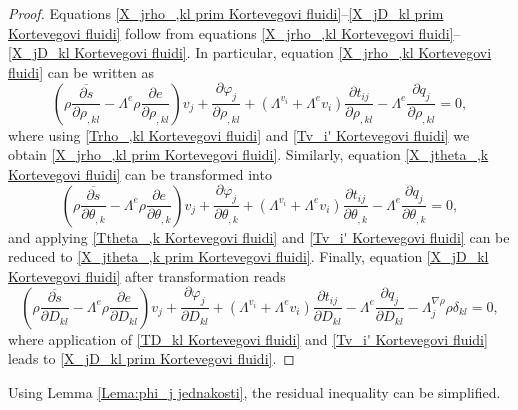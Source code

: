 \documentclass[a4paper,fleqn]{cas-sc}
\theoremstyle{definition}
\begin{document}
\begin{proof}
	Equations \eqref{X_jrho_,kl prim Kortevegovi fluidi}--\eqref{X_jD_kl prim Kortevegovi fluidi} follow from equations \eqref{X_jrho_,kl Kortevegovi fluidi}--\eqref{X_jD_kl Kortevegovi fluidi}. In particular, equation \eqref{X_jrho_,kl Kortevegovi fluidi} can be written as
	\begin{equation*}
		\label{koeficijent uz rho_,kl po x_j Kortevegovi fluidi}
		\left( \rho\overline{\dfrac{\partial s}{\partial\rho_{,kl}}} 
		- \Lambda^e\rho\dfrac{\partial e}{\partial\rho_{,kl}} \right) v_j 
		+ \dfrac{\partial\varphi_j}{\partial\rho_{,kl}} 
		+ \left( \Lambda^{v_i} + \Lambda^e v_i \right) \dfrac{\partial t_{ij}}{\partial\rho_{,kl}} 
		- \Lambda^e\dfrac{\partial q_j}{\partial\rho_{,kl}} = 0,
	\end{equation*}
	where using \eqref{Trho_,kl Kortevegovi fluidi} and \eqref{Tv_i' Kortevegovi fluidi} we obtain \eqref{X_jrho_,kl prim Kortevegovi fluidi}. Similarly, equation \eqref{X_jtheta_,k Kortevegovi fluidi} can be transformed into
	\begin{equation*}
		\label{koeficijent uz theta_,k po x_j Kortevegovi fluidi}
		\left(\rho\overline{\dfrac{\partial s}{\partial\theta_{,k}}} 
		- \Lambda^e\rho\dfrac{\partial e}{\partial\theta_{,k}}\right) v_j 
		+ \dfrac{\partial\varphi_j}{\partial\theta_{,k}} 
		+ \left( \Lambda^{v_i} + \Lambda^e v_i \right) \dfrac{\partial t_{ij}}{\partial\theta_{,k}} 
		- \Lambda^e\dfrac{\partial q_j}{\partial\theta_{,k}} = 0, 
	\end{equation*}
	and applying \eqref{Ttheta_,k Kortevegovi fluidi} and \eqref{Tv_i' Kortevegovi fluidi} can be reduced to \eqref{X_jtheta_,k prim Kortevegovi fluidi}. Finally, equation \eqref{X_jD_kl Kortevegovi fluidi} after transformation reads 
	\begin{equation*}
		\label{koeficijent uz D_kl po x_j Kortevegovi fluidi}
		\left(\rho\overline{\dfrac{\partial s}{\partial D_{kl}}} 
		- \Lambda^e\rho\dfrac{\partial e}{\partial D_{kl}}\right) v_j 
		+ \dfrac{\partial\varphi_j}{\partial D_{kl}} 
		+ \left( \Lambda^{v_i} + \Lambda^e v_i \right) \dfrac{\partial t_{ij}}{\partial D_{kl}} 
		- \Lambda^e\dfrac{\partial q_j}{\partial D_{kl}} 
		- \Lambda^{\nabla\rho}_j\rho\delta_{kl} = 0,
	\end{equation*}
	where application of \eqref{TD_kl Kortevegovi fluidi} and \eqref{Tv_i' Kortevegovi fluidi} leads to \eqref{X_jD_kl prim Kortevegovi fluidi}. 
\end{proof}

Using Lemma \ref{Lema:phi_j jednakosti}, the residual inequality can be simplified. 
\end{document}
